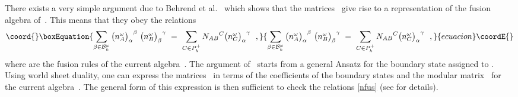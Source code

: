 \documentclass[12pt,a4paper]{article}
\providecommand{\mf}{\mathfrak} %
\providecommand{\mc}{\mathcal} %
\def\bL{\mc{B}} %
\def\areps{P_k^+} %
\def\tareps{\bL^\omega_k} %
\def\asg{{\hat{\mf{g}}}}
\def\b{\beta}
\begin{document}
There exists a very simple argument due to Behrend et
al.~\cite{Behrend:1999bn, Behrend:1998fd} 
which shows that the matrices~\coordHE{} give 
rise to a representation of the fusion algebra of~\myHighlight{$\asg_k$}\coordHE{}. This 
means that they obey the relations 
\begin{equation}\coord{}\boxEquation{
 \label{nfus}
  \sum_{\b\in\tareps} {\bigl(n_A^\omega\bigr)_\alpha}^\beta \ 
    {\bigl(n_B^\omega\bigr)_\beta}^\gamma \ = \ 
    \sum_{C\in\areps} {N_{AB}}^{C} {\bigl(n_C^\omega\bigr)_\alpha}^\gamma\ \ , 
}{
 \sum_{\b\in\tareps} {\bigl(n_A^\omega\bigr)_\alpha}^\beta \ 
    {\bigl(n_B^\omega\bigr)_\beta}^\gamma \ = \ 
    \sum_{C\in\areps} {N_{AB}}^{C} {\bigl(n_C^\omega\bigr)_\alpha}^\gamma\ \ , 
}{ecuacion}\coordE{}\end{equation}
where \myHighlight{${N_{AB}}^C$}\coordHE{} are the fusion rules of the current algebra~\myHighlight{$\asg_k$}\coordHE{}. 
The argument of~\cite{Behrend:1999bn, Behrend:1998fd} starts from a general
Ansatz for the boundary state assigned to \myHighlight{$\alpha\in\tareps$}\coordHE{}.
Using world sheet duality, one can express the matrices~\coordHE{} in 
terms of the coefficients of the boundary states and the modular 
matrix~\myHighlight{$S$}\coordHE{} for the current algebra~\myHighlight{$\asg_k$}\coordHE{}. The general form 
of this expression is then sufficient to check the relations \eqref{nfus}
(see \cite{Behrend:1999bn, Behrend:1998fd} for details). 
\smallskip
 
\end{document}

